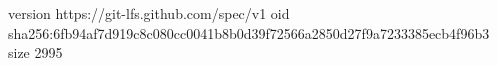 version https://git-lfs.github.com/spec/v1
oid sha256:6fb94af7d919c8c080cc0041b8b0d39f72566a2850d27f9a7233385ecb4f96b3
size 2995
